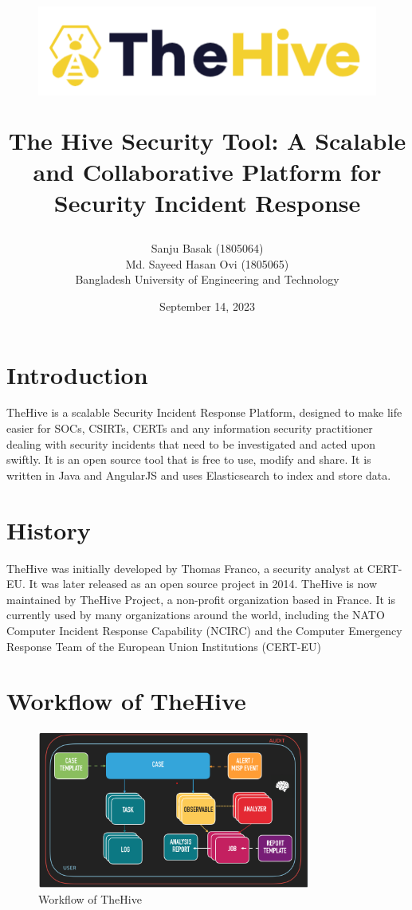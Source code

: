 \documentclass{article}
\title{
    \begin{figure}[ht]
        \begin{center}
        \includegraphics[width=0.6\columnwidth]{logo.png}
        \end{center}
    \end{figure}
    \textbf{The Hive Security Tool: A Scalable and Collaborative Platform for Security Incident Response} \\ %
}
\author{
  \begin{tabular}{c}
    Sanju Basak (1805064) \\
    Md. Sayeed Hasan Ovi (1805065)\\
    Bangladesh University of Engineering and Technology
  \end{tabular}
}
\date{September 14, 2023}
\begin{document}
\maketitle

\section*{Introduction}
TheHive is a scalable Security Incident Response Platform, designed to make life easier for SOCs, CSIRTs, CERTs and any information security practitioner dealing with security incidents that need to be investigated and acted upon swiftly. It is an open source tool that is free to use, modify and share. It is written in Java and AngularJS and uses Elasticsearch to index and store data.

\section*{History}
TheHive was initially developed by Thomas Franco, a security analyst at CERT-EU. It was later released as an open source project in 2014. TheHive is now maintained by TheHive Project, a non-profit organization based in France.
It is currently used by many organizations around the world, including the NATO Computer Incident Response Capability (NCIRC) and the Computer Emergency Response Team of the European Union Institutions (CERT-EU)



\section*{Workflow of TheHive}
\begin{figure}[ht]
    \centering
    \includegraphics[width=0.8\textwidth]{workflow.png}
    \caption{Workflow of TheHive}
    \label{fig:workflow}
\end{figure}
\end{document}
